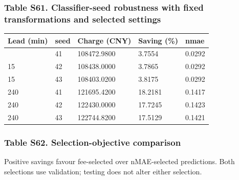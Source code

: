 \documentclass[a4paper,11pt]{article}
\newcounter{none}
\begin{document}
\subsubsection{Table S61. Classifier-seed robustness with fixed transformations and selected settings}\label{table-s61.-classifier-seed-robustness-with-fixed-transformations-and-selected-settings}

{\def\LTcaptype{none} %
\begin{longtable}[]{@{}lllll@{}}
\toprule\noalign{}
Lead (min) & seed & Charge (CNY) & Saving (\%) & nmae \\
\midrule\noalign{}
\endhead
\bottomrule\noalign{}
\endlastfoot
15 & 41 & 108472.9800 & 3.7554 & 0.0292 \\
15 & 42 & 108438.0000 & 3.7865 & 0.0292 \\
15 & 43 & 108403.0200 & 3.8175 & 0.0292 \\
240 & 41 & 121695.4200 & 18.2181 & 0.1417 \\
240 & 42 & 122430.0000 & 17.7245 & 0.1423 \\
240 & 43 & 122744.8200 & 17.5129 & 0.1421 \\
\end{longtable}
}

\subsubsection{Table S62. Selection-objective comparison}\label{table-s62.-selection-objective-comparison}

Positive savings favour fee-selected over nMAE-selected predictions. Both selections use validation; testing does not alter either selection.
\end{document}
